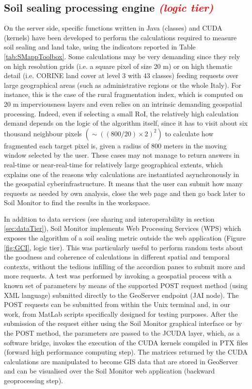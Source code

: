 \documentclass[APA,LATO1COL,doublespace]{WileyNJD-v2}
\newcommand{\toberevised}[1]{\emph{\textcolor{red}{#1}}} %
\begin{document}
\subsection{ Soil sealing processing engine \toberevised{(logic tier)} }
\label{sec:logicTier}
On the server side, specific functions written in Java (classes) and CUDA (kernels) have been developed to perform the calculations required to measure soil sealing and land take, using the indicators reported in Table \ref{tab:SMappToolbox}. 
Some calculations may be very demanding since they rely on high resolution grids (i.e. a square pixel of size 20 m) or on high thematic detail (i.e. CORINE land cover at level 3 with 43 classes) feeding requests over large geographical areas (such as administrative regions or the whole Italy).
For instance, this is the case of the rural fragmentation index, which is computed on 20 m imperviousness layers and even relies on an intrinsic demanding geospatial processing. 
Indeed, even if selecting a small RoI, the relatively high calculation demand depends on the logic of the algorithm itself, since it has to visit about six thousand neighbour pixels $\left( \sim \left( \left(800/20\right)\times2 \right)^2 \right)$ to calculate how fragmented each target pixel is, given a radius of 800 meters in the moving window selected by the user.
These cases may not manage to return answers in real-time or near-real-time for relatively large geographical extents, which explains one of the reasons why calculations are instantiated asynchronously in the geospatial cyberinfrastructure.
It means that the user can submit how many requests as needed by own analysis, close the web page and then go back later to Soil Monitor to find the results in the workspace.

In addition to data services (see sharing and interoperability in section \ref{sec:dataTier}), Soil Monitor implements Web Processing Services (WPS) which exposes the algorithm of a soil sealing metric outside the web application (Figure \ref{fig:GCI}, logic tier). 
This was particularly useful to perform random tests about the goodness and coherence of calculations in different spatial and temporal contexts, without the tedious infilling of the accordion panes to submit more and more requests. 
A test was performed by invoking a geospatial process with a known set of parameters by means of the supported POST request method (using XML language) submitted directly to the GeoServer endpoint (JAI node).
The POST requests can be submitted from within the Unix terminal and, in our work, from MatLab scripts specifically designed for testing purposes.
After the submission of the request either using the Soil Monitor graphical interface or by the POST method, the parameters are passed to the JCUDA layer, which, as a software bridge, invokes the execution of the CUDA kernels compiled in PTX files (forward high performance computing step). The matrices returned by the CUDA calculations are manipulated to become GIS data that are stored in GeoServer and can be visualised over the Soil Monitor web application (backward geoprocessing step).
\end{document}
